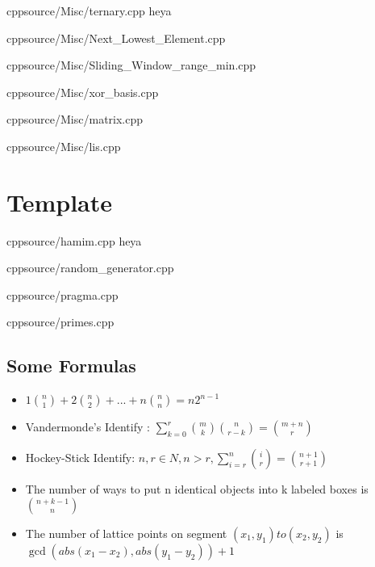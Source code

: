 \documentclass[landscape, 8pt, a4paper, oneside]{extarticle}
\begin{document}
\begin{multicols}{3}
{}
{}
{cpp}{source/Misc/ternary.cpp}
{heya}

{}
{}
{cpp}{source/Misc/Next_Lowest_Element.cpp}

{}
{}
{cpp}{source/Misc/Sliding_Window_range_min.cpp}

{}
{}
{cpp}{source/Misc/xor_basis.cpp}

{}
{}
{cpp}{source/Misc/matrix.cpp}

{}
{}
{cpp}{source/Misc/lis.cpp}

\section{Template}
{}
{}
{}
{cpp}{source/hamim.cpp}
{heya}

{}
{}
{cpp}{source/random_generator.cpp}

{}
{}
{cpp}{source/pragma.cpp}

{}
{}
{cpp}{source/primes.cpp}

\subsection{Some Formulas}
\begin{itemize}
    \item \(1\binom{n}{1}+2\binom{n}{2}+...+n\binom{n}{n}=n2^{n-1}\)
    \item Vandermonde’s Identify : \(\sum_{k=0}^{r}\binom{m}{k}\binom{n}{r-k}=\binom{m+n}{r}\)
    \item Hockey-Stick Identify: \(n, r\in N, n > r, \sum_{i=r}^{n}\binom{i}{r}=\binom{n + 1}{r + 1}\)
    \item The number of ways to put n identical objects into k labeled boxes is \(\binom{n+k-1}{n}\)
    \item The number of lattice points on segment \((x_1,y_1) to (x_2,y_2)\) is \(\gcd(abs(x_1-x_2),abs(y_1-y_2))+1\)
\end{itemize}

\end{multicols}
\end{document}
